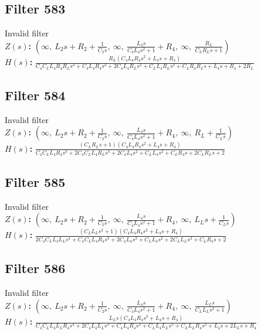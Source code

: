 \documentclass{article}
\begin{document}
\subsection*{Filter 583}
Invalid filter \\ 
\textbf{$Z(s)$:} $\left( \infty, \  L_{2} s + R_{2} + \frac{1}{C_{2} s}, \  \infty, \  \frac{L_{4} s}{C_{4} L_{4} s^{2} + 1} + R_{4}, \  \infty, \  \frac{R_{L}}{C_{L} R_{L} s + 1}\right)$ \\ 
\textbf{$H(s)$:} $\frac{R_{L} \left(C_{4} L_{4} R_{4} s^{2} + L_{4} s + R_{4}\right)}{C_{4} C_{L} L_{4} R_{4} R_{L} s^{3} + C_{4} L_{4} R_{4} s^{2} + 2 C_{4} L_{4} R_{L} s^{2} + C_{L} L_{4} R_{L} s^{2} + C_{L} R_{4} R_{L} s + L_{4} s + R_{4} + 2 R_{L}}$ \\ 
\subsection*{Filter 584}
Invalid filter \\ 
\textbf{$Z(s)$:} $\left( \infty, \  L_{2} s + R_{2} + \frac{1}{C_{2} s}, \  \infty, \  \frac{L_{4} s}{C_{4} L_{4} s^{2} + 1} + R_{4}, \  \infty, \  R_{L} + \frac{1}{C_{L} s}\right)$ \\ 
\textbf{$H(s)$:} $\frac{\left(C_{L} R_{L} s + 1\right) \left(C_{4} L_{4} R_{4} s^{2} + L_{4} s + R_{4}\right)}{C_{4} C_{L} L_{4} R_{4} s^{3} + 2 C_{4} C_{L} L_{4} R_{L} s^{3} + 2 C_{4} L_{4} s^{2} + C_{L} L_{4} s^{2} + C_{L} R_{4} s + 2 C_{L} R_{L} s + 2}$ \\ 
\subsection*{Filter 585}
Invalid filter \\ 
\textbf{$Z(s)$:} $\left( \infty, \  L_{2} s + R_{2} + \frac{1}{C_{2} s}, \  \infty, \  \frac{L_{4} s}{C_{4} L_{4} s^{2} + 1} + R_{4}, \  \infty, \  L_{L} s + \frac{1}{C_{L} s}\right)$ \\ 
\textbf{$H(s)$:} $\frac{\left(C_{L} L_{L} s^{2} + 1\right) \left(C_{4} L_{4} R_{4} s^{2} + L_{4} s + R_{4}\right)}{2 C_{4} C_{L} L_{4} L_{L} s^{4} + C_{4} C_{L} L_{4} R_{4} s^{3} + 2 C_{4} L_{4} s^{2} + C_{L} L_{4} s^{2} + 2 C_{L} L_{L} s^{2} + C_{L} R_{4} s + 2}$ \\ 
\subsection*{Filter 586}
Invalid filter \\ 
\textbf{$Z(s)$:} $\left( \infty, \  L_{2} s + R_{2} + \frac{1}{C_{2} s}, \  \infty, \  \frac{L_{4} s}{C_{4} L_{4} s^{2} + 1} + R_{4}, \  \infty, \  \frac{L_{L} s}{C_{L} L_{L} s^{2} + 1}\right)$ \\ 
\textbf{$H(s)$:} $\frac{L_{L} s \left(C_{4} L_{4} R_{4} s^{2} + L_{4} s + R_{4}\right)}{C_{4} C_{L} L_{4} L_{L} R_{4} s^{4} + 2 C_{4} L_{4} L_{L} s^{3} + C_{4} L_{4} R_{4} s^{2} + C_{L} L_{4} L_{L} s^{3} + C_{L} L_{L} R_{4} s^{2} + L_{4} s + 2 L_{L} s + R_{4}}$ \\ 
\end{document}
